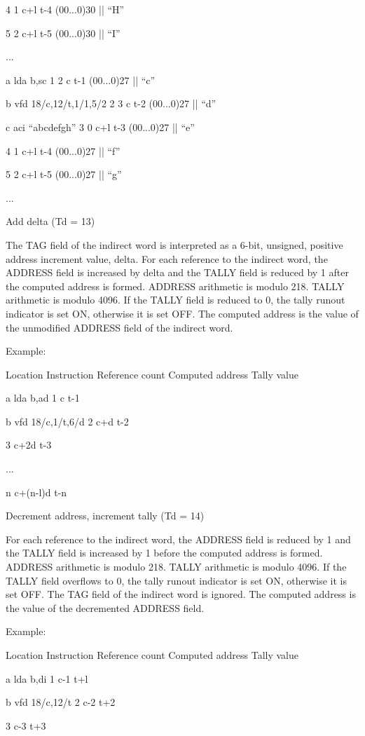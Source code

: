 4 1 c+l t-4 (00...0)30 || {``}H''

5 2 c+l t-5 (00...0)30 || {``}I''

...

a lda b,sc 1 2 c t-1 (00...0)27 || {``}c''

b vfd 18/c,12/t,1/1,5/2 2 3 c t-2 (00...0)27 || {``}d''

c aci {``}abcdefgh'' 3 0 c+l t-3 (00...0)27 || {``}e''

4 1 c+l t-4 (00...0)27 || {``}f''

5 2 c+l t-5 (00...0)27 || {``}g''

...


Add delta (Td = 13)


The TAG field of the indirect word is interpreted as a 6-bit, unsigned,
positive address increment value, delta. For each reference to the indirect
word, the ADDRESS field is increased by delta and the TALLY field is reduced by
1 after the computed address is formed. ADDRESS arithmetic is modulo 218. TALLY
arithmetic is modulo 4096. If the TALLY field is reduced to 0, the tally runout
indicator is set ON, otherwise it is set OFF.  The computed address is the
value of the unmodified ADDRESS field of the indirect word.


Example:

Location Instruction Reference count Computed address Tally value

a lda b,ad 1 c t-1

b vfd 18/c,1/t,6/d 2 c+d t-2

3 c+2d t-3

...

n c+(n-l)d t-n

Decrement address, increment tally (Td = 14)


For each reference to the indirect word, the ADDRESS field is reduced by 1 and
the TALLY field is increased by 1 before the computed address is formed.
ADDRESS arithmetic is modulo 218. TALLY arithmetic is modulo 4096. If the TALLY
field overflows to 0, the tally runout indicator is set ON, otherwise it is set
OFF. The TAG field of the indirect word is ignored. The computed address is the
value of the decremented ADDRESS field.


Example:

Location Instruction Reference count Computed address Tally value

a lda b,di 1 c-1 t+l

b vfd 18/c,12/t 2 c-2 t+2

3 c-3 t+3

